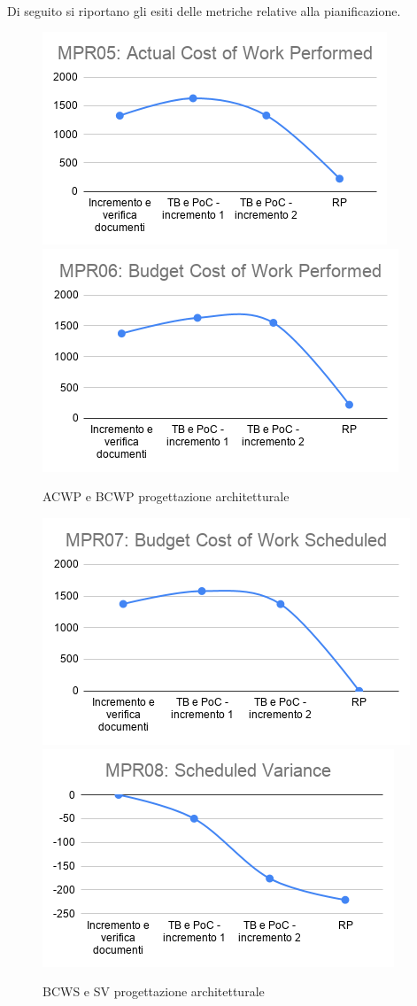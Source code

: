 \\
Di seguito si riportano gli esiti delle metriche relative alla pianificazione.
\begin{figure}[h!]
	\includegraphics[scale=0.6]{Immagini/ACWP_PArchitetturale.png}\quad
	\includegraphics[scale=0.6]{Immagini/BCWP_PArchitetturale.png}
	\caption{ACWP e BCWP progettazione architetturale}
	\label{fig:BCWP_PArchitetturale}
\end{figure}
\begin{figure}[h!]
	\includegraphics[scale=0.5]{Immagini/BCWS_PArchitetturale.png}\quad
 	\includegraphics[scale=0.6]{Immagini/SV_PArchitetturale.png}
 	\caption{BCWS e SV progettazione architetturale}
 	\label{fig:SV_PArchitetturale}
\end{figure}
